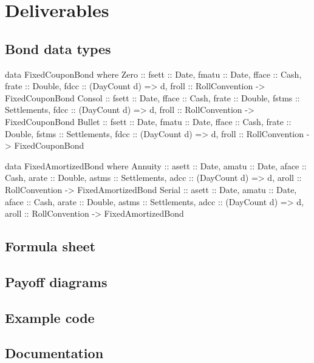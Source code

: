 \chapter{Deliverables}

\section{Bond data types}\label{sec:appbonds}

\begin{hscode}
data FixedCouponBond where
  Zero   :: { fsett :: Date,
              fmatu :: Date,
              fface :: Cash,
              frate :: Double,
              fdcc  :: (DayCount d) => d,
              froll :: RollConvention } -> FixedCouponBond
  Consol :: { fsett :: Date,
              fface :: Cash,
              frate :: Double,
              fstms :: Settlements,
              fdcc  :: (DayCount d) => d,
              froll :: RollConvention } -> FixedCouponBond
  Bullet :: { fsett :: Date,
              fmatu :: Date,
              fface :: Cash,
              frate :: Double,
              fstms :: Settlements,
              fdcc  :: (DayCount d) => d,
              froll :: RollConvention } -> FixedCouponBond
\end{hscode}

\begin{hscode}
data FixedAmortizedBond where 
  Annuity :: { asett :: Date,
               amatu :: Date,
               aface :: Cash,
               arate :: Double,
               astms :: Settlements,
               adcc  :: (DayCount d) => d,
               aroll :: RollConvention } -> FixedAmortizedBond
  Serial :: {  asett :: Date,
               amatu :: Date,
               aface :: Cash,
               arate :: Double,
               astms :: Settlements,
               adcc  :: (DayCount d) => d,
               aroll :: RollConvention } -> FixedAmortizedBond
\end{hscode}

\section{Formula sheet}
\section{Payoff diagrams}
\section{Example code}
\section{Documentation}
